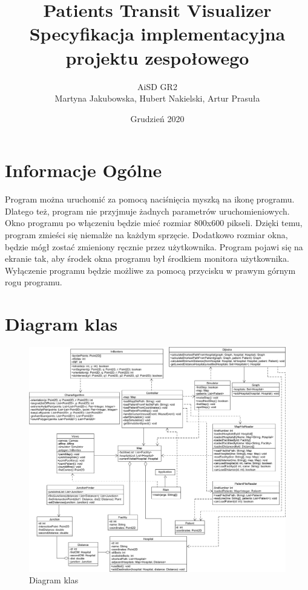 \documentclass[]{article}
\title{\textbf{Patients Transit Visualizer}\\Specyfikacja implementacyjna projektu zespołowego}
\author{\small{AiSD GR2}\\Martyna Jakubowska, Hubert Nakielski, Artur Prasuła}
\date{Grudzień 2020}
\begin{document}
    \maketitle
    \newpage
    
    \section{Informacje Ogólne} %
    Program można uruchomić za pomocą naciśnięcia myszką na ikonę programu.
    Dlatego też, program nie przyjmuje żadnych parametrów uruchomieniowych.
    Okno programu po włączeniu będzie mieć rozmiar 800x600 pikseli.
    Dzięki temu, program zmieści się niemalże na każdym sprzęcie.
    Dodatkowo rozmiar okna, będzie mógł zostać zmieniony ręcznie przez użytkownika.
    Program pojawi się na ekranie tak, aby środek okna programu był środkiem monitora użytkownika.
    Wyłączenie programu będzie możliwe za pomocą przycisku w prawym górnym rogu programu.
    
    
    \section{Diagram klas} %
        \begin{figure}[!h]
            \centering
            \includegraphics[width=\textwidth]{diagram_klas.png}
            \caption{Diagram klas}
            \label{fig:Diagram klas}
        \end{figure}
    
\end{document}
